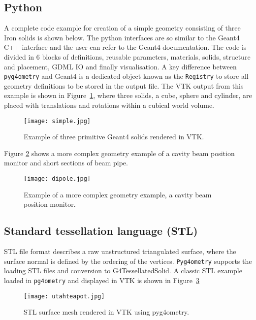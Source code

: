 \documentclass[a4paper,
               keeplastbox,   %
               ]{jacow}
\begin{document}
\subsection{Python}
A complete code example for creation of a simple geometry consisting of three Iron solids is shown below. The python interfaces are so similar to the Geant4 C++ interface and the user can refer to the Geant4 documentation.  
The code is divided in 6 blocks of definitions, reusable parameters, materials, solids, structure and placement, GDML IO and finally visualisation. A key difference between \verb|pyg4ometry| and Geant4 is a dedicated object known as the \verb|Registry| to store all geometry definitions to be stored in the output file. The VTK output from this example is shown in Figure~\ref{fig:simple}, where three solids, a cube, sphere and cylinder, are placed with translations and rotations within a cubical world volume.
\begin{figure}[!htb]
   \centering
   \texttt{[image: simple.jpg]}
   \caption{Example of three primitive Geant4 solids rendered in VTK.}
   \label{fig:simple}
\end{figure}

Figure \ref{fig:dipole} shows a more complex geometry example of a cavity beam position monitor and short sections of beam pipe.
\begin{figure}[!htb]
   \centering
   \texttt{[image: dipole.jpg]}
   \caption{Example of a more complex geometry example, a cavity beam position monitor.}
   \label{fig:dipole}
\end{figure}

\subsection{Standard tessellation language (STL)}
STL file format describes a raw unstructured triangulated surface, where the surface normal is defined by the ordering of the vertices. \verb|Pyg4ometry| supports the loading 
STL files and conversion to G4TessellatedSolid. A classic STL example loaded in \verb|pg4ometry| and displayed in VTK is shown in Figure~\ref{fig:utahteapot}
\begin{figure}[!htb]
   \centering
   \texttt{[image: utahteapot.jpg]}

   \caption{STL surface mesh rendered in VTK using pyg4ometry.}
   \label{fig:utahteapot}
\end{figure}
\end{document}
